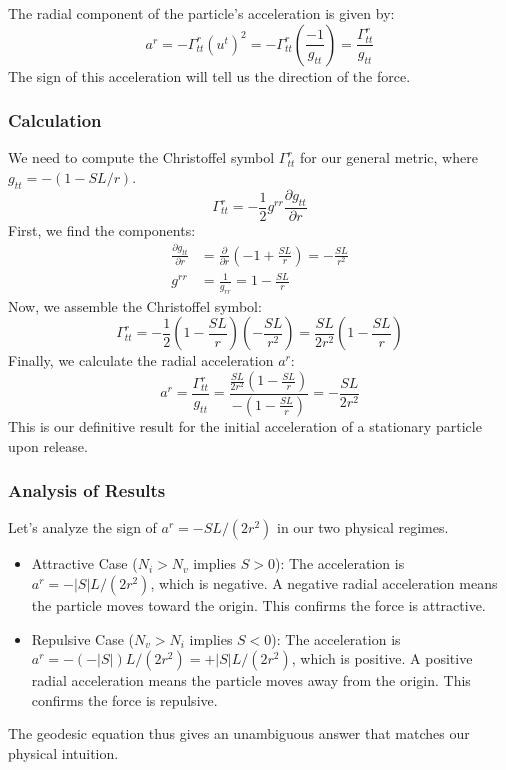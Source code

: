 \documentclass[%
  reprint,
  superscriptaddress,
  showpacs,
  showkeys,
  amsmath,amssymb,
  pra,
  longbibliography,
  floatfix,
  x11names
]{revtex4-2}
\begin{document}
The radial component of the particle's acceleration is given by:
\begin{equation}
a^r = -\Gamma^r_{tt} (u^t)^2 = -\Gamma^r_{tt} \left(\frac{-1}{g_{tt}}\right) = \frac{\Gamma^r_{tt}}{g_{tt}}
\end{equation}
The sign of this acceleration will tell us the direction of the force.

\subsubsection{Calculation}
We need to compute the Christoffel symbol $\Gamma^r_{tt}$ for our general metric, where $g_{tt} = -(1 - SL/r)$.
\begin{equation}
\Gamma^r_{tt} = -\frac{1}{2} g^{rr} \frac{\partial g_{tt}}{\partial r}
\end{equation}
First, we find the components:
\begin{align*}
\frac{\partial g_{tt}}{\partial r} &= \frac{\partial}{\partial r}\left(-1 + \frac{SL}{r}\right) = -\frac{SL}{r^2} \\
g^{rr} &= \frac{1}{g_{rr}} = 1 - \frac{SL}{r}
\end{align*}
Now, we assemble the Christoffel symbol:
\begin{equation}
\Gamma^r_{tt} = -\frac{1}{2} \left(1 - \frac{SL}{r}\right) \left(-\frac{SL}{r^2}\right) = \frac{SL}{2r^2}\left(1 - \frac{SL}{r}\right)
\end{equation}
Finally, we calculate the radial acceleration $a^r$:
\begin{equation}
a^r = \frac{\Gamma^r_{tt}}{g_{tt}} = \frac{\frac{SL}{2r^2}\left(1 - \frac{SL}{r}\right)}{-\left(1 - \frac{SL}{r}\right)} = -\frac{SL}{2r^2}
\end{equation}
This is our definitive result for the initial acceleration of a stationary particle upon release.

\subsubsection{Analysis of Results}
Let's analyze the sign of $a^r = -SL/(2r^2)$ in our two physical regimes.
\begin{itemize}
    \item {Attractive Case ($N_i > N_v$ implies $S > 0$):}
    The acceleration is $a^r = -|S|L/(2r^2)$, which is {negative}. A negative radial acceleration means the particle moves toward the origin. This confirms the force is attractive.

    \item {Repulsive Case ($N_v > N_i$ implies $S < 0$):}
    The acceleration is $a^r = -(-|S|)L/(2r^2) = +|S|L/(2r^2)$, which is {positive}. A positive radial acceleration means the particle moves away from the origin. This confirms the force is repulsive.
\end{itemize}
The geodesic equation thus gives an unambiguous answer that matches our physical intuition.
\end{document}
